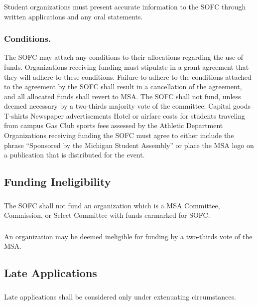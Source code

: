 \subsubsection{}
Student organizations must present accurate information to the SOFC through written applications and any oral statements.
\subsubsection{Conditions.}
\subsubsubsection{}
The SOFC may attach any conditions to their allocations regarding the use of funds.
\subsubsubsection{}
Organizations receiving funding must stipulate in a grant agreement that they will adhere to these conditions.
\subsubsubsection{}
Failure to adhere to the conditions attached to the agreement by the SOFC shall result in a cancellation of the agreement, and all allocated funds shall revert to MSA.
\subsubsubsection{}
The SOFC shall not fund, unless deemed necessary by a two-thirds majority vote of the committee:
\subsubsubsubsection{}
Capital goods
\subsubsubsubsection{}
T-shirts
\subsubsubsubsection{}
Newspaper advertisements
\subsubsubsubsection{}
Hotel or airfare costs for students traveling from campus
\subsubsubsubsection{}
Gas
\subsubsubsubsection{}
Club sports fees assessed by the Athletic Department
\subsubsubsection{}
Organizations receiving funding the SOFC must agree to either include the phrase ``Sponsored by the Michigan Student Assembly'' or place the MSA logo on a publication that is distributed for the event.
 

\subsection{Funding Ineligibility}
\subsubsection{}
The SOFC shall not fund an organization which is a MSA Committee, Commission, or Select Committee with funds earmarked for SOFC. 
\subsubsection{}
An organization may be deemed ineligible for funding by a two-thirds vote of the MSA.

\subsection{Late Applications}
\subsubsection{}
Late applications shall be considered only under extenuating circumstances.
